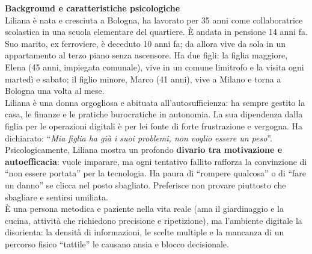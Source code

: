 \documentclass[11pt,a4paper]{article}
\begin{document}
\begin{tcolorbox}[colback=backgroundColor,colframe=borderColor,arc=2mm]
    \textbf{Background e caratteristiche psicologiche} \\[4pt]
    {\small
    Liliana è nata e cresciuta a Bologna, ha lavorato per 35 anni come collaboratrice scolastica in una scuola elementare del quartiere. È andata in pensione 14 anni fa. Suo marito, ex ferroviere, è deceduto 10 anni fa; da allora vive da sola in un appartamento al terzo piano senza ascensore. Ha due figli: la figlia maggiore, Elena (45 anni, impiegata comunale), vive in un comune limitrofo e la visita ogni martedì e sabato; il figlio minore, Marco (41 anni), vive a Milano e torna a Bologna una volta al mese. \\[4pt]

    Liliana è una donna orgogliosa e abituata all'autosufficienza: ha sempre gestito la casa, le finanze e le pratiche burocratiche in autonomia. La sua dipendenza dalla figlia per le operazioni digitali è per lei fonte di forte frustrazione e vergogna. Ha dichiarato: ``\textit{Mia figlia ha già i suoi problemi, non voglio essere un peso}''. \\[4pt]

    Psicologicamente, Liliana mostra un profondo \textbf{divario tra motivazione e autoefficacia}: vuole imparare, ma ogni tentativo fallito rafforza la convinzione di ``non essere portata'' per la tecnologia. Ha paura di ``rompere qualcosa'' o di ``fare un danno'' se clicca nel posto sbagliato. Preferisce non provare piuttosto che sbagliare e sentirsi umiliata. \\[4pt]

    È una persona metodica e paziente nella vita reale (ama il giardinaggio e la cucina, attività che richiedono precisione e ripetizione), ma l'ambiente digitale la disorienta: la densità di informazioni, le scelte multiple e la mancanza di un percorso fisico ``tattile'' le causano ansia e blocco decisionale.
    }
\end{tcolorbox}

\vspace{0.3cm}

\end{document}
